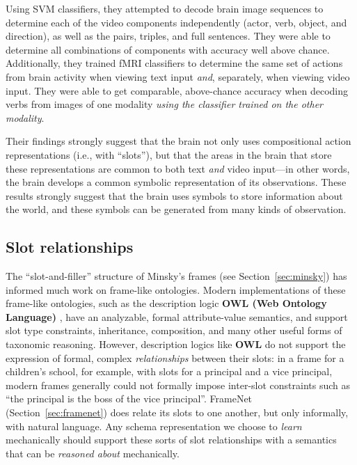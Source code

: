 Using SVM classifiers, they attempted to decode brain image sequences to determine each of the video components independently (actor, verb, object, and direction), as well as the pairs, triples, and full sentences. They were able to determine all combinations of components with accuracy well above chance. Additionally, they trained fMRI classifiers to determine the same set of actions from brain activity when viewing text input \textit{and}, separately, when viewing video input. They were able to get comparable, above-chance accuracy when decoding verbs from images of one modality \textit{using the classifier trained on the other modality}.

Their findings strongly suggest that the brain not only uses compositional action representations (i.e., with ``slots''), but that the areas in the brain that store these representations are common to both text \textit{and} video input---in other words, the brain develops a common symbolic representation of its observations. These results strongly suggest that the brain uses symbols to store information about the world, and these symbols can be generated from many kinds of observation.

\subsection{Slot relationships}
The ``slot-and-filler'' structure of Minsky's frames (see Section~\ref{sec:minsky}) has informed much work on frame-like ontologies. Modern implementations of these frame-like ontologies, such as the description logic \textbf{OWL (Web Ontology Language)} \citep{mcguinness2004owl}, have an analyzable, formal attribute-value semantics, and support slot type constraints, inheritance, composition, and many other useful forms of taxonomic reasoning. However, description logics like \textbf{OWL} do not support the expression of formal, complex \textit{relationships} between their slots: in a frame for a children's school, for example, with slots for a principal and a vice principal, modern frames generally could not formally impose inter-slot constraints such as ``the principal is the boss of the vice principal''. FrameNet (Section~\ref{sec:framenet}) does relate its slots to one another, but only informally, with natural language. Any schema representation we choose to \textit{learn} mechanically should support these sorts of slot relationships with a semantics that can be \textit{reasoned about} mechanically.

